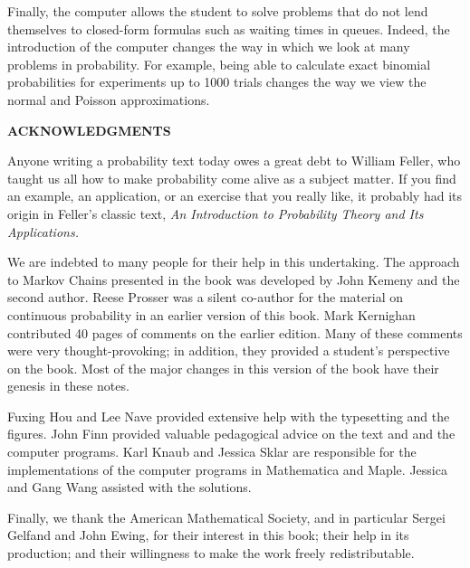 Finally, the computer allows the student to solve problems that do not lend
themselves to 
closed-form formulas such as waiting times in queues. Indeed, the introduction
of the computer 
changes the way in which we look at many problems in probability. For example,
being able to 
calculate exact binomial probabilities for experiments up to 1000 trials
changes the way we view 
the normal and Poisson approximations.

\bigskip\centerline{\bf ACKNOWLEDGMENTS }\medskip

Anyone writing a probability text today owes a great debt to William Feller,
who taught us all how to make probability come alive as a subject matter.  If
you find an example, an application, or an exercise that you really like, it
probably had its origin in Feller's classic text, {\sl An Introduction to
Probability Theory and Its Applications.}



We are indebted to many people for their help in this undertaking. The approach
to Markov Chains presented in the book was developed by John Kemeny and the
second author.  Reese Prosser was a silent co-author for the material on
continuous probability in an earlier version of this book. Mark Kernighan
contributed 40 pages of comments on the earlier
edition.  Many of
these comments were very thought-provoking; in addition, they provided a
student's perspective on the
book.   Most of the major changes in this version of the book have their genesis
in
these notes.

Fuxing Hou and Lee Nave  provided extensive help with the
typesetting and the
figures.  John Finn provided valuable pedagogical advice on the text and and the
computer programs.   Karl Knaub and Jessica Sklar are responsible for the
implementations of the
computer programs in
Mathematica and Maple.  Jessica and Gang Wang assisted with the solutions.

Finally, we thank the American Mathematical Society, and in particular
Sergei Gelfand and John Ewing,
for their interest in this
book; their help in its production; and their willingness to
make the work freely redistributable.
